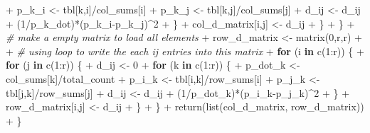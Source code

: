 \documentclass[
]{article}
\newenvironment{Shaded}{\begin{snugshade}}{\end{snugshade}}
\newcommand{\CommentTok}[1]{\textcolor[rgb]{0.56,0.35,0.01}{\textit{#1}}}
\newcommand{\ControlFlowTok}[1]{\textcolor[rgb]{0.13,0.29,0.53}{\textbf{#1}}}
\newcommand{\DecValTok}[1]{\textcolor[rgb]{0.00,0.00,0.81}{#1}}
\newcommand{\FunctionTok}[1]{\textcolor[rgb]{0.00,0.00,0.00}{#1}}
\newcommand{\NormalTok}[1]{#1}
\newcommand{\OtherTok}[1]{\textcolor[rgb]{0.56,0.35,0.01}{#1}}
\newcommand{\SpecialCharTok}[1]{\textcolor[rgb]{0.00,0.00,0.00}{#1}}
\begin{document}
\begin{Shaded}
\begin{Highlighting}[]
\SpecialCharTok{+}\NormalTok{         p\_k\_i }\OtherTok{\textless{}{-}}\NormalTok{ tbl[k,i]}\SpecialCharTok{/}\NormalTok{col\_sums[i]}
\SpecialCharTok{+}\NormalTok{         p\_k\_j }\OtherTok{\textless{}{-}}\NormalTok{ tbl[k,j]}\SpecialCharTok{/}\NormalTok{col\_sums[j]}
\SpecialCharTok{+}\NormalTok{         d\_ij }\OtherTok{\textless{}{-}}\NormalTok{ d\_ij }\SpecialCharTok{+}\NormalTok{ (}\DecValTok{1}\SpecialCharTok{/}\NormalTok{p\_k\_dot)}\SpecialCharTok{*}\NormalTok{(p\_k\_i}\SpecialCharTok{{-}}\NormalTok{p\_k\_j)}\SpecialCharTok{\^{}}\DecValTok{2}
\SpecialCharTok{+}\NormalTok{       \}}
\SpecialCharTok{+}\NormalTok{       col\_d\_matrix[i,j] }\OtherTok{\textless{}{-}}\NormalTok{ d\_ij}
\SpecialCharTok{+}\NormalTok{     \}}
\SpecialCharTok{+}\NormalTok{   \}}
\SpecialCharTok{+}   \CommentTok{\# make a empty matrix to load all elements}
\SpecialCharTok{+}\NormalTok{   row\_d\_matrix }\OtherTok{\textless{}{-}} \FunctionTok{matrix}\NormalTok{(}\DecValTok{0}\NormalTok{,r,r)}
\SpecialCharTok{+}   
\SpecialCharTok{+}   \CommentTok{\# using loop to write the each ij entries into this matrix}
\SpecialCharTok{+}   \ControlFlowTok{for}\NormalTok{ (i }\ControlFlowTok{in} \FunctionTok{c}\NormalTok{(}\DecValTok{1}\SpecialCharTok{:}\NormalTok{r)) \{}
\SpecialCharTok{+}     \ControlFlowTok{for}\NormalTok{ (j }\ControlFlowTok{in} \FunctionTok{c}\NormalTok{(}\DecValTok{1}\SpecialCharTok{:}\NormalTok{r)) \{}
\SpecialCharTok{+}\NormalTok{       d\_ij }\OtherTok{\textless{}{-}} \DecValTok{0}
\SpecialCharTok{+}       \ControlFlowTok{for}\NormalTok{ (k }\ControlFlowTok{in} \FunctionTok{c}\NormalTok{(}\DecValTok{1}\SpecialCharTok{:}\NormalTok{r)) \{}
\SpecialCharTok{+}\NormalTok{         p\_dot\_k }\OtherTok{\textless{}{-}}\NormalTok{ col\_sums[k]}\SpecialCharTok{/}\NormalTok{total\_count}
\SpecialCharTok{+}\NormalTok{         p\_i\_k }\OtherTok{\textless{}{-}}\NormalTok{ tbl[i,k]}\SpecialCharTok{/}\NormalTok{row\_sums[i]}
\SpecialCharTok{+}\NormalTok{         p\_j\_k }\OtherTok{\textless{}{-}}\NormalTok{ tbl[j,k]}\SpecialCharTok{/}\NormalTok{row\_sums[j]}
\SpecialCharTok{+}\NormalTok{         d\_ij }\OtherTok{\textless{}{-}}\NormalTok{ d\_ij }\SpecialCharTok{+}\NormalTok{ (}\DecValTok{1}\SpecialCharTok{/}\NormalTok{p\_dot\_k)}\SpecialCharTok{*}\NormalTok{(p\_i\_k}\SpecialCharTok{{-}}\NormalTok{p\_j\_k)}\SpecialCharTok{\^{}}\DecValTok{2}
\SpecialCharTok{+}\NormalTok{       \}}
\SpecialCharTok{+}\NormalTok{       row\_d\_matrix[i,j] }\OtherTok{\textless{}{-}}\NormalTok{ d\_ij}
\SpecialCharTok{+}\NormalTok{     \}}
\SpecialCharTok{+}\NormalTok{   \}}
\SpecialCharTok{+}   \FunctionTok{return}\NormalTok{(}\FunctionTok{list}\NormalTok{(col\_d\_matrix, row\_d\_matrix))}
\SpecialCharTok{+}\NormalTok{ \}}
\end{Highlighting}
\end{Shaded}
\end{document}
